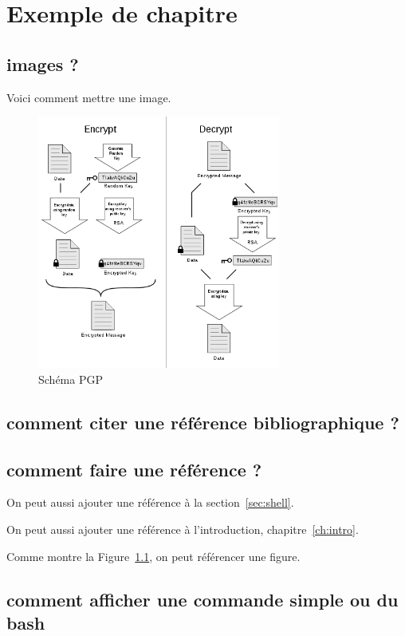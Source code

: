 \chapter{Exemple de chapitre}

\lipsum[1]


\section{images ?}

Voici comment mettre une image.

\begin{figure}
	\centering
	\includegraphics[width=8cm]{images/PGP_101.png}
	\caption{Schéma PGP}
	\label{fig:pgp}
\end{figure}


\section{comment citer une référence bibliographique ?}


\section{comment faire une référence ?}

On peut aussi ajouter une référence à la section~\ref{sec:shell}.

On peut aussi ajouter une référence à l'introduction, chapitre~\ref{ch:intro}.

Comme montre la Figure~\ref{fig:pgp}, on peut référencer une figure.


\section{comment afficher une commande simple ou du bash}

